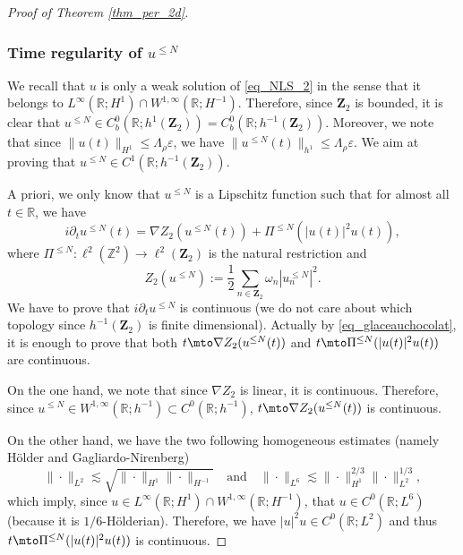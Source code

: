 \begin{proof}[Proof of Theorem \ref{thm_per_2d}]
\subsubsection*{Time regularity of $u^{\leq N} $}
We recall that $u$ is only a weak solution of \eqref{eq_NLS_2} in the sense that it belongs to $L^\infty(\mathbb{R}; H^1) \cap W^{1,\infty}(\mathbb{R};H^{-1})$. Therefore, since $\mathbf{Z}_2$ is bounded, it is clear that $ u^{\leq N} \in C^0_b(\mathbb{R}; h^{1}(\mathbf{Z}_2))= C^0_b(\mathbb{R}; h^{-1}(\mathbf{Z}_2)) $. Moreover, we note that since $\| u(t) \|_{H^1}\leq \Lambda_\rho \varepsilon$, we have $\|u^{\leq N} (t) \|_{h^1} \leq \Lambda_\rho \varepsilon$. We aim at proving that $u^{\leq N} \in C^1(\mathbb{R}; h^{-1}(\mathbf{Z}_2))$.

A priori, we only know that $u^{\leq N}$ is a Lipschitz function such that for almost all $t\in\mathbb{R}$, we have
\begin{equation}
\label{eq_glaceauchocolat}
i\partial_t u^{\leq N}(t) = \nabla Z_2(u^{\leq N}(t)) + \Pi^{\leq N} (|u(t)|^2 u(t)),
\end{equation}
where $\Pi^{\leq N}: \ell^2(\mathbb{Z}^2) \to \ell^2(\mathbf{Z}_2) $ is the natural restriction and
\[
Z_2(u^{\leq N}):= \frac12 \sum_{n\in \mathbf{Z}_2} \omega_n |u_n^{\leq N}|^2.
\]
We have to prove that $i\partial_t u^{\leq N}$ is continuous (we do not care about which topology since $ h^{-1}(\mathbf{Z}_2)$ is finite dimensional). Actually by \eqref{eq_glaceauchocolat}, it is enough to prove that both $t \mto \nabla Z_2(u^{\leq N}(t))$ and $t\mto \Pi^{\leq N} (|u(t)|^2 u(t))$ are continuous.

On the one hand, we note that since $\nabla Z_2$ is linear, it is continuous. Therefore, since $u^{\leq N} \in W^{1,\infty}(\mathbb{R};h^{-1}) \subset C^0(\mathbb{R};h^{-1})$, $t \mto \nabla Z_2(u^{\leq N}(t))$ is continuous.

On the other hand, we have the two following homogeneous estimates (namely Hölder and Gagliardo-Nirenberg)
\[
\| \cdot\|_{L^2}\lesssim \sqrt{ \| \cdot\|_{H^1} \| \cdot\|_{H^{-1}}} \quad \text{and} \quad \| \cdot \|_{L^6} \lesssim \| \cdot\|_{H^1}^{2/3} \| \cdot\|_{L^2}^{1/3},
\]
which imply, since $u\in L^\infty(\mathbb{R}; H^1) \cap W^{1,\infty}(\mathbb{R};H^{-1})$, that $u\in C^0(\mathbb{R};L^6)$ (because it is $1/6$-Hölderian). Therefore, we have $|u|^2 u \in C^0(\mathbb{R};L^2)$ and thus $t\mto \Pi^{\leq N} (|u(t)|^2 u(t))$ is continuous.


\end{proof}
